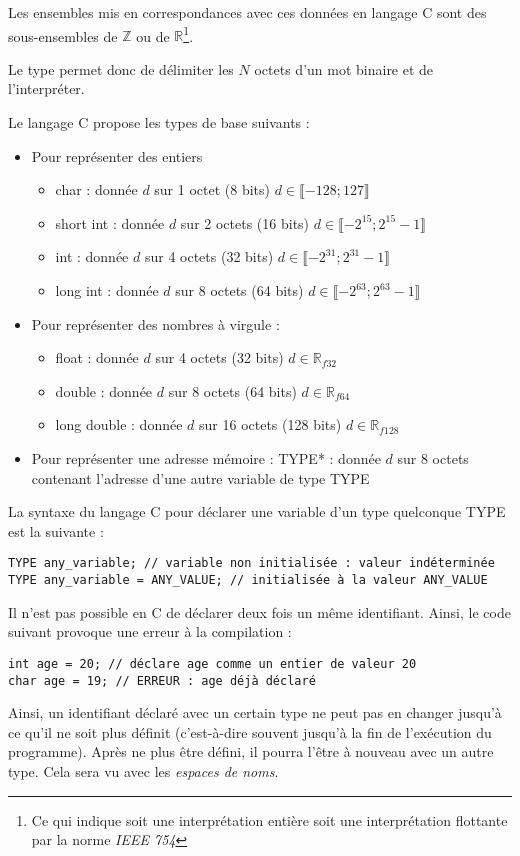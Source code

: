 \documentclass[../../../main.tex]{subfiles}
\begin{document}
Les ensembles mis en correspondances avec ces données en langage C sont des sous-ensembles de $\mathbb{Z}$ ou de $\mathbb{R}$\footnote{Ce qui indique soit une interprétation entière soit une interprétation flottante par la norme \textit{IEEE 754}}. 

Le type permet donc de délimiter les $N$ octets d'un mot binaire et de l'interpréter.
 
Le langage C propose les types de base suivants :
\begin{itemize}
\item Pour représenter des entiers 
\begin{itemize}
	\item \textsf{char} : donnée $d$ sur 1 octet (8 bits) $d\in{\llbracket-128; 127\rrbracket}$
	\item \textsf{short int} : donnée $d$ sur 2 octets (16 bits) $d\in{\llbracket-2^{15}; 2^{15}-1\rrbracket}$
	\item \textsf{int} : donnée $d$ sur 4 octets (32 bits) $d\in{\llbracket-2^{31}; 2^{31}-1\rrbracket}$
	\item \textsf{long int} : donnée $d$ sur 8 octets (64 bits) $d\in{\llbracket-2^{63}; 2^{63}-1\rrbracket}$
\end{itemize}
\item Pour représenter des nombres à virgule :
\begin{itemize}
	\item \textsf{float} : donnée $d$ sur 4 octets (32 bits) $d\in{\mathbb{R}_{f32}}$
	\item \textsf{double} : donnée $d$ sur 8 octets (64 bits) $d\in{\mathbb{R}_{f64}}$
	\item \textsf{long double} : donnée $d$ sur 16 octets (128 bits) $d\in{\mathbb{R}_{f128}}$
\end{itemize}
\item Pour représenter une adresse mémoire : \textsf{TYPE*} : donnée $d$ sur 8 octets contenant l'adresse d'une autre variable de type \textsf{TYPE}
\end{itemize}
La syntaxe du langage C pour déclarer une variable d'un type quelconque \textsf{TYPE} est la suivante :
\begin{verbatim}
TYPE any_variable; // variable non initialisée : valeur indéterminée
TYPE any_variable = ANY_VALUE; // initialisée à la valeur ANY_VALUE
\end{verbatim}
Il n'est pas possible en C de déclarer deux fois un même identifiant. Ainsi, le code suivant provoque une erreur à la compilation :
\begin{verbatim}
int age = 20; // déclare age comme un entier de valeur 20
char age = 19; // ERREUR : age déjà déclaré
\end{verbatim}
Ainsi, un identifiant déclaré avec un certain type ne peut pas en changer jusqu'à ce qu'il ne soit plus définit (c'est-à-dire souvent jusqu'à la fin de l'exécution du programme). Après ne plus être défini, il pourra l'être à nouveau avec un autre type. Cela sera vu avec les \textit{espaces de noms}.
 
\end{document}
